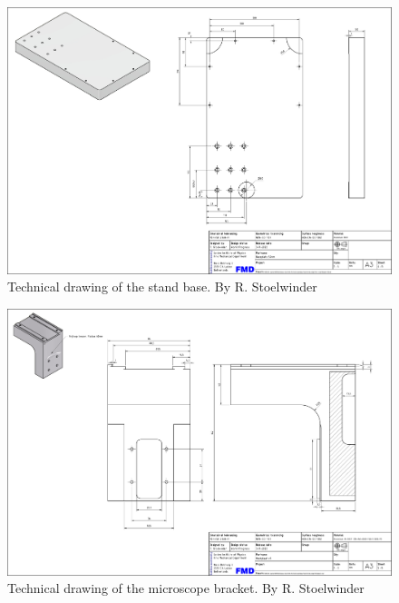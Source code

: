 \documentclass[10pt]{article}
\begin{document}
\clearpage
\begin{figure}[htp] 
  \centering
  \includegraphics[angle=90,origin=c,width=\textwidth]{img/cad/pag4.pdf}
  \caption{Technical drawing of the stand base. By R. Stoelwinder}
  \label{doc:tech_base}
\end{figure}

\clearpage
\begin{figure}[htp] 
  \centering
  \includegraphics[angle=90,origin=c,width=\textwidth]{img/cad/pag5.pdf}
  \caption{Technical drawing of the microscope bracket. By R. Stoelwinder}
  \label{doc:tech_microscope_bracket}
\end{figure}





\end{document}
